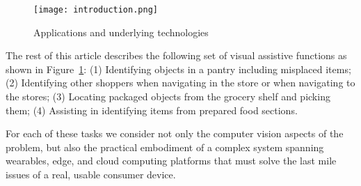 \begin{figure}[!htb]
\centering
\texttt{[image: introduction.png]}
\caption{Applications and underlying technologies}
\label{fig:introduction}
\end{figure} 

The rest of this article describes the following set of visual
assistive functions as shown in Figure~\ref{fig:introduction}:
(1) Identifying objects in a pantry including misplaced items; 
(2) Identifying other shoppers when navigating in the
store or when navigating to the stores; 
(3) Locating packaged objects from the grocery shelf and picking them; 
(4) Assisting in identifying items from prepared food sections. 

For each of these tasks we consider not only the computer vision
aspects of the problem, but also the practical embodiment of a
complex system spanning wearables, edge, and cloud computing
platforms that must solve the last mile issues of a real, usable
consumer device.
